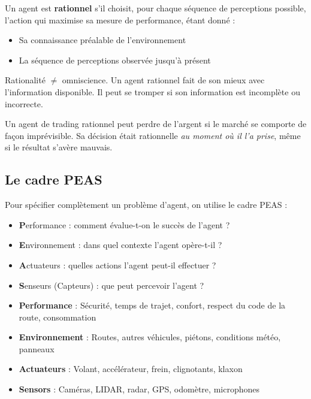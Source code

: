\documentclass[11pt,a4paper]{article}
\begin{document}
\begin{definitionbox}
Un agent est \textbf{rationnel} s'il choisit, pour chaque séquence de perceptions possible, l'action qui maximise sa mesure de performance, étant donné :
\begin{itemize}
    \item Sa connaissance préalable de l'environnement
    \item La séquence de perceptions observée jusqu'à présent
\end{itemize}
\end{definitionbox}

Rationalité $\neq$ omniscience. Un agent rationnel fait de son mieux avec l'information disponible. Il peut se tromper si son information est incomplète ou incorrecte.

\begin{exemplebox}
Un agent de trading rationnel peut perdre de l'argent si le marché se comporte de façon imprévisible. Sa décision était rationnelle \textit{au moment où il l'a prise}, même si le résultat s'avère mauvais.
\end{exemplebox}

\subsection{Le cadre PEAS}

Pour spécifier complètement un problème d'agent, on utilise le cadre PEAS :

\begin{definitionbox}
\begin{itemize}
    \item \textbf{P}erformance : comment évalue-t-on le succès de l'agent ?
    \item \textbf{E}nvironnement : dans quel contexte l'agent opère-t-il ?
    \item \textbf{A}ctuateurs : quelles actions l'agent peut-il effectuer ?
    \item \textbf{S}enseurs (Capteurs) : que peut percevoir l'agent ?
\end{itemize}
\end{definitionbox}

\begin{exemplebox}
\begin{itemize}
    \item \textbf{Performance} : Sécurité, temps de trajet, confort, respect du code de la route, consommation
    \item \textbf{Environnement} : Routes, autres véhicules, piétons, conditions météo, panneaux
    \item \textbf{Actuateurs} : Volant, accélérateur, frein, clignotants, klaxon
    \item \textbf{Sensors} : Caméras, LIDAR, radar, GPS, odomètre, microphones
\end{itemize}
\end{exemplebox}
\end{document}
